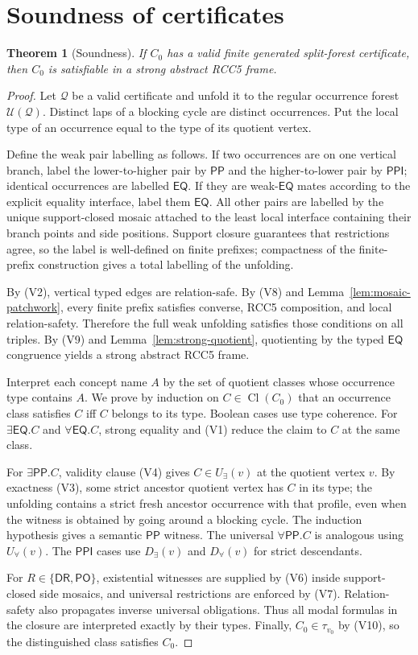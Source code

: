 \documentclass[11pt]{article}
\newtheorem{theorem}[definition]{Theorem}
\theoremstyle{remark}
\newcommand{\DR}{\mathsf{DR}}
\newcommand{\PO}{\mathsf{PO}}
\newcommand{\PP}{\mathsf{PP}}
\newcommand{\PPI}{\mathsf{PPI}}
\newcommand{\EQ}{\mathsf{EQ}}
\newcommand{\Cl}{\operatorname{Cl}}
\newcommand{\Q}{\mathcal{Q}}
\newcommand{\U}{\mathcal{U}}
\begin{document}
\section{Soundness of certificates}
\begin{theorem}[Soundness]\label{thm:soundness}
If $C_0$ has a valid finite generated split-forest certificate, then $C_0$ is satisfiable in a strong abstract RCC5 frame.
\end{theorem}
\begin{proof}
Let $\Q$ be a valid certificate and unfold it to the regular occurrence forest $\U(\Q)$.  Distinct laps of a blocking cycle are distinct occurrences.  Put the local type of an occurrence equal to the type of its quotient vertex.

Define the weak pair labelling as follows.  If two occurrences are on one vertical branch, label the lower-to-higher pair by $\PP$ and the higher-to-lower pair by $\PPI$; identical occurrences are labelled $\EQ$.  If they are weak-$\EQ$ mates according to the explicit equality interface, label them $\EQ$.  All other pairs are labelled by the unique support-closed mosaic attached to the least local interface containing their branch points and side positions.  Support closure guarantees that restrictions agree, so the label is well-defined on finite prefixes; compactness of the finite-prefix construction gives a total labelling of the unfolding.

By (V2), vertical typed edges are relation-safe.  By (V8) and Lemma~\ref{lem:mosaic-patchwork}, every finite prefix satisfies converse, RCC5 composition, and local relation-safety.  Therefore the full weak unfolding satisfies those conditions on all triples.  By (V9) and Lemma~\ref{lem:strong-quotient}, quotienting by the typed $\EQ$ congruence yields a strong abstract RCC5 frame.

Interpret each concept name $A$ by the set of quotient classes whose occurrence type contains $A$.  We prove by induction on $C\in\Cl(C_0)$ that an occurrence class satisfies $C$ iff $C$ belongs to its type.  Boolean cases use type coherence.  For $\exists\EQ.C$ and $\forall\EQ.C$, strong equality and (V1) reduce the claim to $C$ at the same class.

For $\exists\PP.C$, validity clause (V4) gives $C\in U_\exists(v)$ at the quotient vertex $v$.  By exactness (V3), some strict ancestor quotient vertex has $C$ in its type; the unfolding contains a strict fresh ancestor occurrence with that profile, even when the witness is obtained by going around a blocking cycle.  The induction hypothesis gives a semantic $\PP$ witness.  The universal $\forall\PP.C$ is analogous using $U_\forall(v)$.  The $\PPI$ cases use $D_\exists(v)$ and $D_\forall(v)$ for strict descendants.

For $R\in\{\DR,\PO\}$, existential witnesses are supplied by (V6) inside support-closed side mosaics, and universal restrictions are enforced by (V7).  Relation-safety also propagates inverse universal obligations.  Thus all modal formulas in the closure are interpreted exactly by their types.  Finally, $C_0\in\tau_{v_0}$ by (V10), so the distinguished class satisfies $C_0$.
\end{proof}
\end{document}
